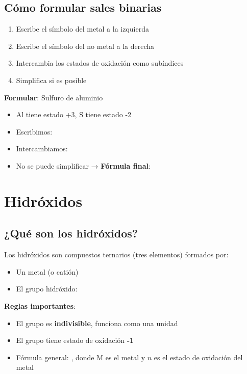 \subsection{Cómo formular sales binarias}

\begin{enumerate}
    \item Escribe el símbolo del metal a la izquierda
    \item Escribe el símbolo del no metal a la derecha
    \item Intercambia los estados de oxidación como subíndices
    \item Simplifica si es posible
\end{enumerate}

\begin{example}
    \textbf{Formular}: Sulfuro de aluminio

    \begin{itemize}
        \item Al tiene estado +3, S tiene estado -2
        \item Escribimos:  
        \item Intercambiamos: 
        \item No se puede simplificar → \textbf{Fórmula final}: 
    \end{itemize}
\end{example}


\section{Hidróxidos}

\subsection{¿Qué son los hidróxidos?}

Los hidróxidos son compuestos ternarios (tres elementos) formados por:
\begin{itemize}
    \item Un metal (o catión)
    \item El grupo hidróxido: 
\end{itemize}

\textbf{Reglas importantes}:
\begin{itemize}
    \item El grupo  es \textbf{indivisible}, funciona como una unidad
    \item El grupo  tiene estado de oxidación \textbf{-1}
    \item Fórmula general: , donde M es el metal y $n$ es el estado de oxidación del metal
\end{itemize}

